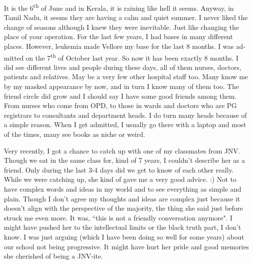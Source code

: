 \begin{english}
\vskip 2pt

It is the 6\textsuperscript{th} of June and in Kerala, it is raining like hell it seems. Anyway, in Tamil Nadu, it seems they are having a calm and quiet summer. I never liked the change of seasons although I knew they were inevitable. Just like changing the place of your operation. For the last few years, I had bases in many different places. However, leukemia made Vellore my base for the last 8 months. I was admitted on the 7\textsuperscript{th} of October last year. So now it has been exactly 8 months. I did see different lives and people during these days, all of them nurses, doctors, patients and relatives. May be a very few other hospital staff too. Many know me by my masked appearance by now, and in turn I know many of them too. The friend circle did grow and I should say I have some good friends among them. From nurses who come from OPD, to those in wards and doctors who are PG registrars to consultants and department heads. I do turn many heads because of a simple reason. When I get admitted, I usually go there with a laptop and most of the times, many see books as niche or weird. 

Very recently, I got a chance to catch up with one of my classmates from JNV. Though we sat in the same class for, kind of 7 years, I couldn't describe her as a friend. Only during the last 3-4 days did we get to know of each other really. While we were catching up, she kind of gave me a very good advice. :) Not to have complex words and ideas in my world and to see everything as simple and plain. Though I don't agree my thoughts and ideas are complex just because it doesn't align with the perspective of the majority, the thing she said just before struck me even more. It was, ``this is not a friendly conversation anymore". I might have pushed her to the intellectual limits or the black truth part, I don't know. I was just arguing (which I have been doing so well for some years) about our school not being progressive. It might have hurt her pride and good memories she cherished of being a JNV-ite.


\end{english}
